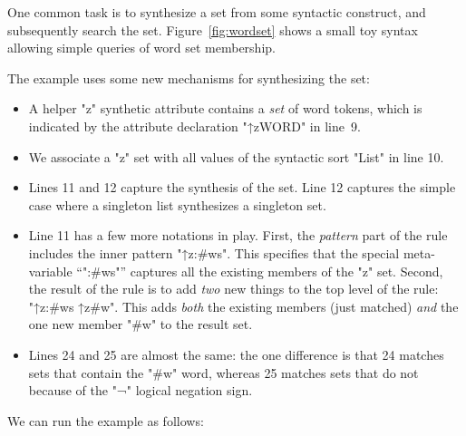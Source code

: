 \documentclass[11pt]{article} %
\begin{document}
\begin{example}
  One common task is to synthesize a set from some syntactic construct, and subsequently search the
  set. Figure~\ref{fig:wordset} shows a small toy syntax allowing simple queries of word set
  membership.

  The example uses some new mechanisms for synthesizing the set:
  \begin{itemize}

  \item A helper "z" synthetic attribute contains a \emph{set} of word tokens, which is indicated by
    the attribute declaration "↑z{WORD}" in line~9.

  \item We associate a "z" set with all values of the syntactic sort "List" in line 10.

  \item Lines 11 and 12 capture the synthesis of the set. Line 12 captures the simple case where a
    singleton list synthesizes a singleton set.

  \item Line 11 has a few more notations in play.  First, the \emph{pattern} part of the rule
    includes the inner pattern "↑z{:#ws}". This specifies that the special meta-variable ``":#ws"''
    captures all the existing members of the "z" set.  Second, the result of the rule is to add
    \emph{two} new things to the top level of the rule: "↑z{:#ws} ↑z{#w}". This adds \emph{both} the
    existing members (just matched) \emph{and} the one new member "#w" to the result set.

  \item Lines 24 and 25 are almost the same: the one difference is that 24 matches sets that contain
    the "#w" word, whereas 25 matches sets that do not because of the "¬" logical negation sign.
  \end{itemize}
  We can run the example as follows:
\end{example}
\end{document}
